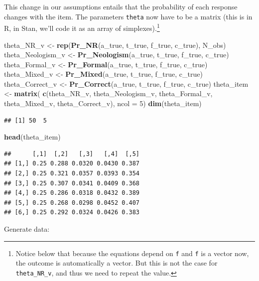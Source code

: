 \documentclass[12pt,]{krantz}
\newenvironment{Shaded}{\begin{snugshade}}{\end{snugshade}}
\newcommand{\KeywordTok}[1]{\textcolor[rgb]{0.13,0.29,0.53}{\textbf{#1}}}
\newcommand{\DataTypeTok}[1]{\textcolor[rgb]{0.13,0.29,0.53}{#1}}
\newcommand{\DecValTok}[1]{\textcolor[rgb]{0.00,0.00,0.81}{#1}}
\newcommand{\StringTok}[1]{\textcolor[rgb]{0.31,0.60,0.02}{#1}}
\newcommand{\NormalTok}[1]{#1}
\theoremstyle{definition}
\theoremstyle{definition}
\theoremstyle{definition}
\theoremstyle{remark}
\begin{document}
This change in our assumptions entails that the probability of each
response changes with the item. The parameters \texttt{theta} now have
to be a matrix (this is in R, in Stan, we'll code it as an array of
simplexes).\footnote{Notice below that because the equations depend on
  \texttt{f} and \texttt{f} is a vector now, the outcome is
  automatically a vector. But this is not the case for
  \texttt{theta\_NR\_v}, and thus we need to repeat the value.}

\begin{Shaded}
\begin{Highlighting}[]
\NormalTok{theta_NR_v <-}\StringTok{ }\KeywordTok{rep}\NormalTok{(}\KeywordTok{Pr_NR}\NormalTok{(a_true, t_true, f_true, c_true), N_obs)}
\NormalTok{theta_Neologism_v <-}\StringTok{ }\KeywordTok{Pr_Neologism}\NormalTok{(a_true, t_true, f_true, c_true)}
\NormalTok{theta_Formal_v <-}\StringTok{ }\KeywordTok{Pr_Formal}\NormalTok{(a_true, t_true, f_true, c_true)}
\NormalTok{theta_Mixed_v <-}\StringTok{ }\KeywordTok{Pr_Mixed}\NormalTok{(a_true, t_true, f_true, c_true)}
\NormalTok{theta_Correct_v <-}\StringTok{ }\KeywordTok{Pr_Correct}\NormalTok{(a_true, t_true, f_true, c_true)}
\NormalTok{theta_item <-}\StringTok{ }\KeywordTok{matrix}\NormalTok{(}
  \KeywordTok{c}\NormalTok{(theta_NR_v,}
\NormalTok{    theta_Neologism_v,}
\NormalTok{    theta_Formal_v,}
\NormalTok{    theta_Mixed_v,}
\NormalTok{    theta_Correct_v),}
  \DataTypeTok{ncol =} \DecValTok{5}\NormalTok{)}
\KeywordTok{dim}\NormalTok{(theta_item)}
\end{Highlighting}
\end{Shaded}

\begin{verbatim}
## [1] 50  5
\end{verbatim}

\begin{Shaded}
\begin{Highlighting}[]
\KeywordTok{head}\NormalTok{(theta_item)}
\end{Highlighting}
\end{Shaded}

\begin{verbatim}
##      [,1]  [,2]   [,3]   [,4]  [,5]
## [1,] 0.25 0.288 0.0320 0.0430 0.387
## [2,] 0.25 0.321 0.0357 0.0393 0.354
## [3,] 0.25 0.307 0.0341 0.0409 0.368
## [4,] 0.25 0.286 0.0318 0.0432 0.389
## [5,] 0.25 0.268 0.0298 0.0452 0.407
## [6,] 0.25 0.292 0.0324 0.0426 0.383
\end{verbatim}

Generate data:
\end{document}

